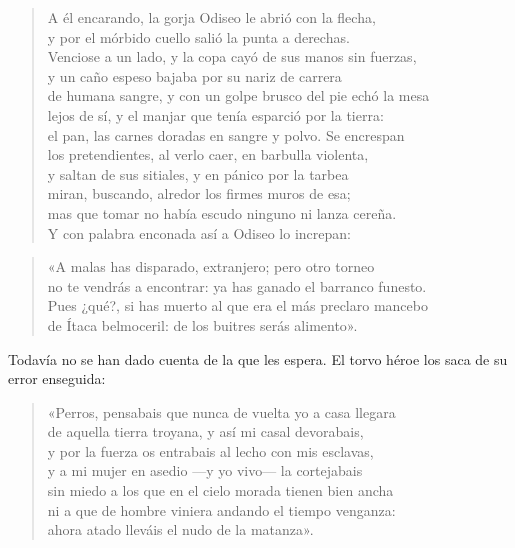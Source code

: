 \begin{verse}
A él encarando, la gorja Odiseo le abrió con la flecha,\\
y por el mórbido cuello salió la punta a derechas.\\
Venciose a un lado, y la copa cayó de sus manos sin fuerzas,\\
y un caño espeso bajaba por su nariz de carrera\\
de humana sangre, y con un golpe brusco del pie echó la mesa\\
lejos de sí, y el manjar que tenía esparció por la tierra:\\
el pan, las carnes doradas en sangre y polvo. Se encrespan\\
los pretendientes, al verlo caer, en barbulla violenta,\\
y saltan de sus sitiales, y en pánico por la tarbea\\
miran, buscando, alredor los firmes muros de esa;\\
mas que tomar no había escudo ninguno ni lanza cereña.\\
Y con palabra enconada así a Odiseo lo increpan:
\end{verse}

\begin{verse}
«A malas has disparado, extranjero; pero otro torneo\\
no te vendrás a encontrar: ya has ganado el barranco funesto.\\
Pues ¿qué?, si has muerto al que era el más preclaro mancebo\\
de Ítaca belmoceril: de los buitres serás alimento».
\end{verse}

Todavía no se han dado cuenta de la que les espera. El torvo héroe los saca de su error enseguida:

\begin{verse}
«Perros, pensabais que nunca de vuelta yo a casa llegara\\
de aquella tierra troyana, y así mi casal devorabais,\\
y por la fuerza os entrabais al lecho con mis esclavas,\\
y a mi mujer en asedio ---y yo vivo--- la cortejabais\\
sin miedo a los que en el cielo morada tienen bien ancha\\
ni a que de hombre viniera andando el tiempo venganza:\\
ahora atado lleváis el nudo de la matanza».
\end{verse}

